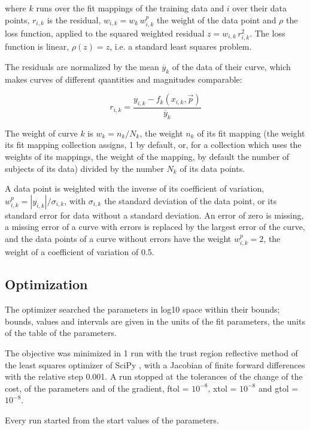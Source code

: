 where $k$ runs over the fit mappings of the training data and $i$ over their data points, $r_{i,k}$ is the residual, $w_{i,k} = w_k\, w^{p}_{i,k}$ the weight of the data point and $\rho$ the loss function, applied to the squared weighted residual $z = w_{i,k}\, r_{i,k}^2$. The loss function is linear, $\rho(z) = z$, i.e. a standard least squares problem.

The residuals are normalized by the mean $\overline{y}_k$ of the data of their curve, which makes curves of different quantities and magnitudes comparable:

\begin{equation}
r_{i,k} = \frac{y_{i,k} - f_k(x_{i,k}, \vec{p})}{\overline{y}_k}
\end{equation}

The weight of curve $k$ is $w_k = n_k / N_k$, the weight $n_k$ of its fit mapping (the weight its fit mapping collection assigns, 1 by default, or, for a collection which uses the weights of its mappings, the weight of the mapping, by default the number of subjects of its data) divided by the number $N_k$ of its data points.

A data point is weighted with the inverse of its coefficient of variation, $w^{p}_{i,k} = |y_{i,k}| / \sigma_{i,k}$, with $\sigma_{i,k}$ the standard deviation of the data point, or its standard error for data without a standard deviation. An error of zero is missing, a missing error of a curve with errors is replaced by the largest error of the curve, and the data points of a curve without errors have the weight $w^{p}_{i,k} = 2$, the weight of a coefficient of variation of 0.5.

\subsection{Optimization}

The optimizer searched the parameters in log10 space within their bounds; bounds, values and intervals are given in the units of the fit parameters, the units of the table of the parameters.

The objective was minimized in 1 run with the trust region reflective method \cite{Branch1999} of the least squares optimizer of SciPy \cite{Virtanen2020}, with a Jacobian of finite forward differences with the relative step 0.001. A run stopped at the tolerances of the change of the cost, of the parameters and of the gradient, ftol = $10^{-8}$, xtol = $10^{-8}$ and gtol = $10^{-8}$.

Every run started from the start values of the parameters.

